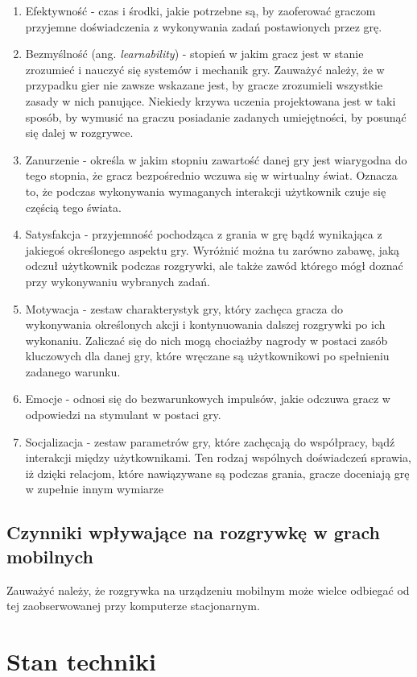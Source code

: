 \documentclass[a4paper,12pt,numbers=noenddot]{report}
\begin{document}
\begin{enumerate}
\item Efektywność - czas i środki, jakie potrzebne są, by zaoferować graczom przyjemne doświadczenia z wykonywania zadań postawionych przez grę.
\item Bezmyślność (ang. \textit{learnability}) - stopień w jakim gracz jest w stanie zrozumieć i nauczyć się systemów i mechanik gry. Zauważyć należy, że w przypadku gier nie zawsze wskazane jest, by gracze zrozumieli wszystkie zasady w nich panujące. Niekiedy krzywa uczenia projektowana jest w taki sposób, by wymusić na graczu posiadanie zadanych umiejętności, by posunąć się dalej w rozgrywce.
\item Zanurzenie - określa w jakim stopniu zawartość danej gry jest wiarygodna do tego stopnia, że gracz bezpośrednio wczuwa się w wirtualny świat. Oznacza to, że podczas wykonywania wymaganych interakcji użytkownik czuje się częścią tego świata.
\item Satysfakcja - przyjemność pochodząca z grania w grę bądź wynikająca z jakiegoś określonego aspektu gry. Wyróżnić można tu zarówno zabawę, jaką odczuł użytkownik podczas rozgrywki, ale także zawód którego mógł doznać przy wykonywaniu wybranych zadań.
\item Motywacja - zestaw charakterystyk gry, który zachęca gracza do wykonywania określonych akcji i kontynuowania dalszej rozgrywki po ich wykonaniu. Zaliczać się do nich mogą chociażby nagrody w postaci zasób kluczowych dla danej gry, które wręczane są użytkownikowi po spełnieniu zadanego warunku.
\item Emocje - odnosi się do bezwarunkowych impulsów, jakie odczuwa gracz w odpowiedzi na stymulant w postaci gry.
\item Socjalizacja - zestaw parametrów gry, które zachęcają do współpracy, bądź interakcji między użytkownikami. Ten rodzaj wspólnych doświadczeń sprawia, iż dzięki relacjom, które nawiązywane są podczas grania, gracze doceniają grę w zupełnie innym wymiarze 
\end{enumerate}

\section{Czynniki wpływające na rozgrywkę w grach mobilnych}
Zauważyć należy, że rozgrywka na urządzeniu mobilnym może wielce odbiegać od tej zaobserwowanej przy komputerze stacjonarnym. 
\chapter{Stan techniki}
\end{document}
